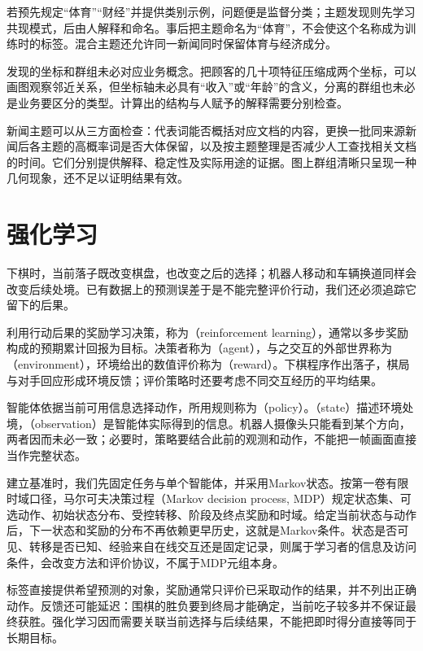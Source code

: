 若预先规定“体育”“财经”并提供类别示例，问题便是监督分类；主题发现则先学习共现模式，后由人解释和命名。事后把主题命名为“体育”，不会使这个名称成为训练时的标签。混合主题还允许同一新闻同时保留体育与经济成分。

发现的坐标和群组未必对应业务概念。把顾客的几十项特征压缩成两个坐标，可以画图观察邻近关系，但坐标轴未必具有“收入”或“年龄”的含义，分离的群组也未必是业务要区分的类型。计算出的结构与人赋予的解释需要分别检查。

新闻主题可以从三方面检查：代表词能否概括对应文档的内容，更换一批同来源新闻后各主题的高概率词是否大体保留，以及按主题整理是否减少人工查找相关文档的时间。它们分别提供解释、稳定性及实际用途的证据。图上群组清晰只呈现一种几何现象，还不足以证明结果有效。

\FloatBarrier
\section{强化学习}
\label{sec:reinforcement-learning}

下棋时，当前落子既改变棋盘，也改变之后的选择；机器人移动和车辆换道同样会改变后续处境。已有数据上的预测误差于是不能完整评价行动，我们还必须追踪它留下的后果。

利用行动后果的奖励学习决策，称为（reinforcement learning），通常以多步奖励构成的预期累计回报为目标。决策者称为（agent），与之交互的外部世界称为（environment），环境给出的数值评价称为（reward）。下棋程序作出落子，棋局与对手回应形成环境反馈；评价策略时还要考虑不同交互经历的平均结果。

智能体依据当前可用信息选择动作，所用规则称为（policy）。（state）描述环境处境，（observation）是智能体实际得到的信息。机器人摄像头只能看到某个方向，两者因而未必一致；必要时，策略要结合此前的观测和动作，不能把一帧画面直接当作完整状态。

建立基准时，我们先固定任务与单个智能体，并采用Markov状态。按第一卷有限时域口径，马尔可夫决策过程（Markov decision process, MDP）规定状态集、可选动作、初始状态分布、受控转移、阶段及终点奖励和时域。给定当前状态与动作后，下一状态和奖励的分布不再依赖更早历史，这就是Markov条件。状态是否可见、转移是否已知、经验来自在线交互还是固定记录，则属于学习者的信息及访问条件，会改变方法和评价协议，不属于MDP元组本身。

标签直接提供希望预测的对象，奖励通常只评价已采取动作的结果，并不列出正确动作。反馈还可能延迟：围棋的胜负要到终局才能确定，当前吃子较多并不保证最终获胜。强化学习因而需要关联当前选择与后续结果，不能把即时得分直接等同于长期目标。

